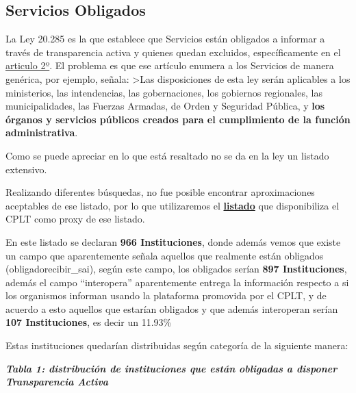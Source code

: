 \documentclass[11pt]{article}
\begin{document}
    \hypertarget{servicios-obligados}{%
\subsection{Servicios Obligados}\label{servicios-obligados}}

La Ley 20.285 es la que establece que Servicios están obligados a
informar a través de transparencia activa y quienes quedan excluidos,
específicamente en el
\href{https://www.leychile.cl/Navegar?idNorma=276363}{articulo 2º}. El
problema es que ese artículo enumera a los Servicios de manera genérica,
por ejemplo, señala: \textgreater Las disposiciones de esta ley serán
aplicables a los ministerios, las intendencias, las gobernaciones, los
gobiernos regionales, las municipalidades, las Fuerzas Armadas, de Orden
y Seguridad Pública, y \textbf{los órganos y servicios públicos creados
para el cumplimiento de la función administrativa}.

Como se puede apreciar en lo que está resaltado no se da en la ley un
listado extensivo.

Realizando diferentes búsquedas, no fue posible encontrar aproximaciones
aceptables de ese listado, por lo que utilizaremos el
\textbf{\href{https://www.portaltransparencia.cl/PortalPdT/web/guest/opendata\#_48_INSTANCE_GI66ozEZ7DNy_=dataset\%2Forganismos\%2Fresource\%2F527e355d-f401-48c7-b984-2d2971db9713}{listado}}
que disponibiliza el CPLT como proxy de ese listado.

    En este listado se declaran \textbf{966 Instituciones}, donde además
vemos que existe un campo que aparentemente señala aquellos que
realmente están obligados (obligadorecibir\_sai), según este campo, los
obligados serían \textbf{897 Instituciones}, además el campo
``interopera'' aparentemente entrega la información respecto a si los
organismos informan usando la plataforma promovida por el CPLT, y de
acuerdo a esto aquellos que estarían obligados y que además interoperan
serían \textbf{107 Instituciones}, es decir un 11.93\%

    
    Estas instituciones quedarían distribuidas según categoría de la
siguiente manera:

    
    \textbf{\emph{Tabla 1: distribución de instituciones que están obligadas
a disponer Transparencia Activa}}
\end{document}
